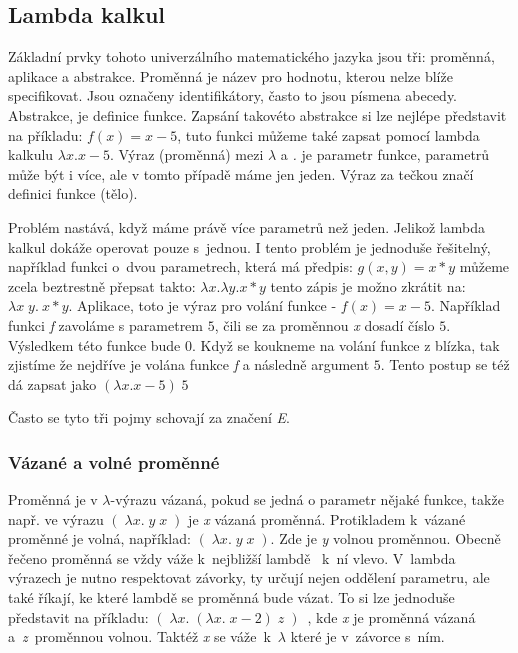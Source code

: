 \documentclass[12pt,a4paper]{report}
\begin{document}
\subsection{Lambda kalkul}
Základní prvky tohoto univerzálního matematického jazyka jsou tři: proměnná, aplikace a abstrakce. Proměnná je název pro hodnotu, kterou nelze blíže specifikovat. Jsou označeny identifikátory, často to jsou písmena abecedy. %
Abstrakce, je definice funkce. Zapsání takovéto abstrakce si lze nejlépe představit na příkladu: $f(x) = x - 5$, tuto funkci můžeme také zapsat pomocí lambda kalkulu $\lambda x.x - 5 $. \cite{volné a vázané} Výraz (proměnná) mezi $\lambda$ a \textit{.} je parametr funkce, parametrů může být i více, ale v tomto případě máme jen jeden. Výraz za tečkou značí definici funkce (tělo). 

Problém nastává, když máme právě více parametrů než jeden. Jelikož lambda kalkul dokáže operovat pouze s~jednou. I tento problém je jednoduše řešitelný, například funkci o~dvou parametrech, která má předpis: $g(x,y) = x * y$  můžeme zcela beztrestně přepsat takto: $\lambda x. \lambda y. x * y $ tento zápis je možno zkrátit na: $\lambda x \; y.\ x * y $. Aplikace, toto je výraz pro volání funkce - $f(x) = x - 5$. Například funkci \textit{f} zavoláme s parametrem $5$, čili se za proměnnou \textit{x} dosadí číslo $5$. Výsledkem této funkce bude $0$. Když se koukneme na volání funkce z blízka, tak zjistíme že nejdříve je volána funkce \textit{f} a následně argument $5$. Tento postup se též dá zapsat jako $(\lambda x.x - 5) \;5$  

Často se tyto tři pojmy schovají za značení \textit{E}. 
\subsubsection{Vázané a volné proměnné}
Proměnná je v $\lambda$-výrazu vázaná, pokud se jedná o parametr nějaké funkce, takže např. ve výrazu $ (\; \lambda x . \; y\; x\; )$ je \textit{x} vázaná proměnná. \cite{volné a vázané} Protikladem k~vázané proměnné je volná, například: $(\; \lambda x . \; y\; x\; )$. Zde je \textit{y} volnou proměnnou. Obecně řečeno proměnná se vždy váže k~nejbližší lambdě ~k~ní vlevo. V~lambda výrazech je nutno respektovat závorky, ty určují nejen oddělení parametru, ale také říkají, ke které lambdě se proměnná bude vázat. To si lze jednoduše představit na příkladu: $ ( \; \lambda x . \; (\lambda x .\; x - 2)\; z\; ) $~, kde \textit{x} je proměnná vázaná a~\textit{z}~proměnnou volnou. Taktéž \textit{x} se váže~k~$\lambda$ které je v~závorce s~ním. 
\end{document}
